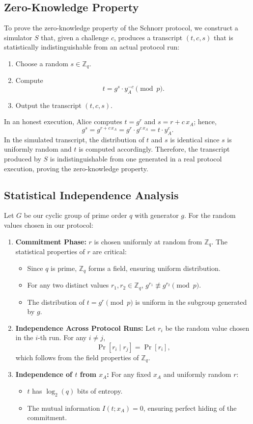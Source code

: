 \documentclass{article}
\begin{document}
\subsection{Zero-Knowledge Property}
\label{sec:zk}
To prove the zero-knowledge property of the Schnorr protocol, we construct a simulator \(S\) that, given a challenge \(c\), produces a transcript \((t, c, s)\) that is statistically indistinguishable from an actual protocol run:
\begin{enumerate}
    \item Choose a random \(s \in \mathbb{Z}_q\).
    \item Compute 
    \[
    t = g^s \cdot y_A^{-c} \pmod{p}.
    \]
    \item Output the transcript \((t, c, s)\).
\end{enumerate}
In an honest execution, Alice computes \(t = g^r\) and \(s = r + c\,x_A\); hence,
\[
g^s = g^{r + c\,x_A} = g^r \cdot g^{c\,x_A} = t \cdot y_A^c.
\]
In the simulated transcript, the distribution of \(t\) and \(s\) is identical since \(s\) is uniformly random and \(t\) is computed accordingly. Therefore, the transcript produced by \(S\) is indistinguishable from one generated in a real protocol execution, proving the zero-knowledge property.

\subsection{Statistical Independence Analysis}
Let \( G \) be our cyclic group of prime order \( q \) with generator \( g \). For the random values chosen in our protocol:
\begin{enumerate}
    \item \textbf{Commitment Phase:} \( r \) is chosen uniformly at random from \( \mathbb{Z}_q \). The statistical properties of \( r \) are critical:
    \begin{itemize}
        \item Since \( q \) is prime, \( \mathbb{Z}_q \) forms a field, ensuring uniform distribution.
        \item For any two distinct values \( r_1, r_2 \in \mathbb{Z}_q \), \( g^{r_1} \not\equiv g^{r_2} \pmod{p} \).
        \item The distribution of \( t = g^r \pmod{p} \) is uniform in the subgroup generated by \( g \).
    \end{itemize}
    \item \textbf{Independence Across Protocol Runs:} Let \( r_i \) be the random value chosen in the \( i \)-th run. For any \( i \neq j \),
    \[
    \Pr[r_i \mid r_j] = \Pr[r_i],
    \]
    which follows from the field properties of \( \mathbb{Z}_q \).
    \item \textbf{Independence of \( t \) from \( x_A \):} For any fixed \( x_A \) and uniformly random \( r \):
    \begin{itemize}
        \item \( t \) has \( \log_2(q) \) bits of entropy.
        \item The mutual information \( I(t; x_A) = 0 \), ensuring perfect hiding of the commitment.
    \end{itemize}
\end{enumerate}
\end{document}
